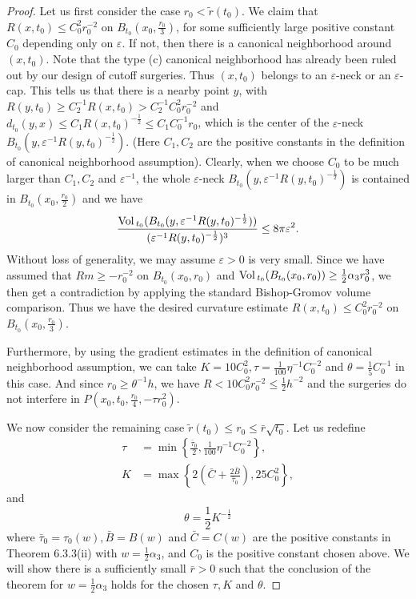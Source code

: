 \begin{proof}
Let us first consider the case $r_0 < \widetilde{r}(t_0)$. We
claim that $R(x,t_0)\leq C^2_0r^{-2}_0$ on
$B_{t_0}(x_0,\frac{r_0}{3})$, for some sufficiently large positive
constant $C_0$ depending only on $\varepsilon$. If not, then there
is a canonical neighborhood around $(x,t_0)$. Note that the type
(c) canonical neighborhood has already been ruled out by our
design of cutoff surgeries. Thus $(x,t_0)$ belongs to an
$\varepsilon$-neck or an $\varepsilon$-cap. This tells us that
there is a nearby point $y$, with $R(y,t_0)\geq C^{-1}_2R(x,t_0) >
C^{-1}_2C^2_0r^{-2}_0$ and $d_{t_0}(y,x)\leq
C_1R(x,t_0)^{-\frac{1}{2}}\leq C_1C^{-1}_0r_0$, which is the
center of the $\varepsilon$-neck
$B_{t_0}(y,\varepsilon^{-1}R(y,t_0)^{-\frac{1}{2}})$. (Here
$C_1,C_2$ are the positive constants in the definition of
canonical neighborhood assumption). Clearly, when we choose $C_0$
to be much larger than $C_1,C_2$ and $\varepsilon^{-1}$, the whole
$\varepsilon$-neck
$B_{t_0}(y,\varepsilon^{-1}R(y,t_0)^{-\frac{1}{2}})$ is contained
in $B_{t_0}(x_0,\frac{r_0}{2})$ and we have \begin{equation}
\frac{\Vol_{t_0}(B_{t_0}(y,\varepsilon^{-1}
R(y,t_0)^{-\frac{1}{2}}))}{(\varepsilon^{-1}
R(y,t_0)^{-\frac{1}{2}})^3}\leq
8\pi\varepsilon^2. %
\end{equation} Without loss of generality, we may assume $\varepsilon>0$ is
very small. Since we have assumed that $Rm\geq -r^{-2}_0$ on
$B_{t_0}(x_0,r_0)$ and ${\rm Vol}\,_{t_0}(B_{t_0}(x_0,r_0))\geq
\frac{1}{2}\alpha_3r^3_0$, we then get a contradiction by applying
the standard Bishop-Gromov volume comparison. Thus we have the
desired curvature estimate $R(x,t_0)\leq C^2_0r^{-2}_0$ on
$B_{t_0}(x_0,\frac{r_0}{3})$.

Furthermore, by using the gradient estimates in the definition of
canonical neighborhood assumption, we can take
$K=10C^2_0,\tau=\frac{1}{100}\eta^{-1}C^{-2}_0$ and
$\theta=\frac{1}{5}C^{-1}_0$ in this case. And since
$r_0\geq\theta^{-1}h$, we have $R<10C^2_0r^{-2}_0\leq
\frac{1}{2}h^{-2}$ and the surgeries do not interfere in
$P(x_0,t_0,\frac{r_0}{4},-\tau r^2_0)$.

We now consider the remaining case $\widetilde{r}(t_0)\leq r_0\leq
\bar{r}\sqrt{t_0}$. Let us redefine
\begin{align*}
\tau&=\min\left\{\frac{\bar{\tau}_0}{2},\frac{1}{100}
\eta^{-1}C^{-2}_0 \right\},\\
K&=\max\left\{2\left(\bar{C}+\frac{2\bar{B}}{\bar{\tau}_0}\right),25C^2_0\right\},
\end{align*}
and
$$
\theta=\frac{1}{2}K^{-\frac{1}{2}}
$$
where $\bar{\tau}_0=\tau_0(w),\bar{B}=B(w)$ and $\bar{C}=C(w)$ are
the positive constants in Theorem 6.3.3(ii) with
$w=\frac{1}{2}\alpha_3$, and $C_0$ is the positive constant chosen
above. We will show there is a sufficiently small $\bar{r}>0$ such
that the conclusion of the theorem for $w=\frac{1}{2}\alpha_3$
holds for the chosen $\tau,K$ and $\theta$.


\end{proof}
